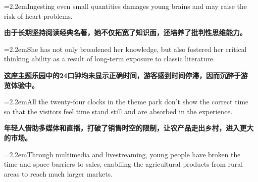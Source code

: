 \documentclass[11pt,a4paper]{article}
\newcommand{\num}[1]{\makebox[1.9em][r]{#1.}\hspace{0.3em}}
\begin{document}
\vspace{0.15em}

\noindent\hangindent=2.2em\hspace{2.2em}Ingesting even small quantities damages young brains and may raise the risk of heart problems.

\num{5}\textbf{由于长期坚持阅读经典名著，她不仅拓宽了知识面，还培养了批判性思维能力。}

\vspace{0.15em}

\noindent\hangindent=2.2em\hspace{2.2em}She has not only broadened her knowledge, but also fostered her critical thinking ability as a result of long-term exposure to classic literature.

\num{6}\textbf{这座主题乐园中的24口钟均未显示正确时间，游客感到时间停滞，因而沉醉于游览体验中。}

\vspace{0.15em}

\noindent\hangindent=2.2em\hspace{2.2em}All the twenty-four clocks in the theme park don’t show the correct time so that the visitors feel time stand still and are absorbed in the experience.

\num{7}\textbf{年轻人借助多媒体和直播，打破了销售时空的限制，让农产品走出乡村，进入更大的市场。}

\vspace{0.15em}

\noindent\hangindent=2.2em\hspace{2.2em}Through multimedia and livestreaming, young people have broken the time and space barriers to sales, enabliing the agricultural products from rural areas to reach much larger markets.
\end{document}
